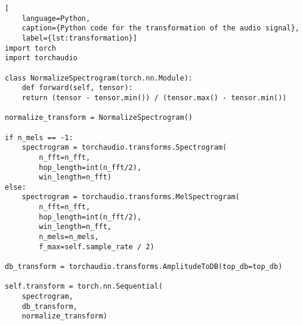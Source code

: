 \begin{lstlisting}[
    language=Python, 
    caption={Python code for the transformation of the audio signal}, 
    label={lst:transformation}]
import torch
import torchaudio

class NormalizeSpectrogram(torch.nn.Module):
    def forward(self, tensor):
    return (tensor - tensor.min()) / (tensor.max() - tensor.min())

normalize_transform = NormalizeSpectrogram()

if n_mels == -1:
    spectrogram = torchaudio.transforms.Spectrogram(
        n_fft=n_fft, 
        hop_length=int(n_fft/2), 
        win_length=n_fft)
else:
    spectrogram = torchaudio.transforms.MelSpectrogram(
        n_fft=n_fft,
        hop_length=int(n_fft/2),
        win_length=n_fft,
        n_mels=n_mels,
        f_max=self.sample_rate / 2)

db_transform = torchaudio.transforms.AmplitudeToDB(top_db=top_db)

self.transform = torch.nn.Sequential(
    spectrogram, 
    db_transform, 
    normalize_transform)
\end{lstlisting}